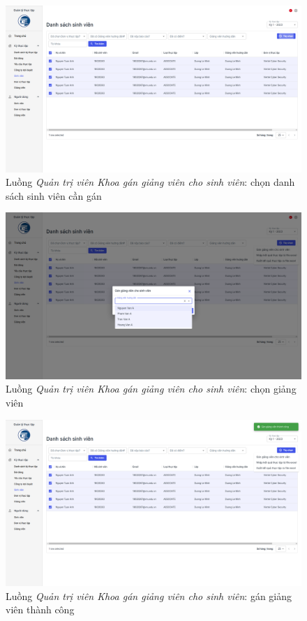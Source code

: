 \documentclass[./../main.tex]{subfiles}
\begin{document}
\begin{figure}[]
	\includegraphics[width=\linewidth]{./images/image76.png}
	\caption{Luồng \emph{Quản trị viên Khoa gán giảng viên cho sinh viên}: chọn danh sách sinh viên cần gán}
	\label{fig:org_admin_select_students}
\end{figure}

\begin{figure}[]
	\includegraphics[width=\linewidth]{./images/image77.png}
	\caption{Luồng \emph{Quản trị viên Khoa gán giảng viên cho sinh viên}: chọn giảng viên}
	\label{fig:org_admin_select_lecturer}
\end{figure}

\begin{figure}[]
	\includegraphics[width=\linewidth]{./images/image78.png}
	\caption{Luồng \emph{Quản trị viên Khoa gán giảng viên cho sinh viên}: gán giảng viên thành công}
	\label{fig:org_admin_assign_success}
\end{figure}
\end{document}
